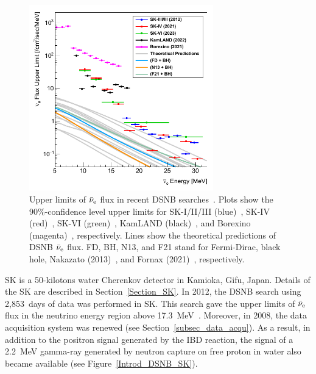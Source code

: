 \begin{figure}[tbp]
	\centering
	\includegraphics[width=8cm]{Figures/Introduction/DSNB_Upper}
	\caption[Upper limits of $\bar{\nu}_{\rm e}$ flux in recent DSNB searches]{
	Upper limits of $\bar{\nu}_{\rm e}$ flux in recent DSNB searches~\cite{2023Ando}.
	Plots show the 90\%-confidence level upper limits for SK-I/II/III (blue)~\cite{2012Abe}, SK-IV (red)~\cite{2021Abe}, SK-VI (green)~\cite{2023Harada}, KamLAND (black)~\cite{2022AbeKamLAND}, and Borexino (magenta)~\cite{2021Agostini}, respectively.
	Lines show the theoretical predictions of DSNB $\bar{\nu}_{\rm e}$ flux.
	FD, BH, N13, and F21 stand for Fermi-Dirac, black hole, Nakazato (2013)~\cite{2013Nakazato}, and Fornax (2021)~\cite{2021Burrows,2021Nakagura}, respectively.
	}\label{Introd_DSNB_Upper}
\end{figure}

\hs
SK is a 50-kilotons water Cherenkov detector in Kamioka, Gifu, Japan.
Details of the SK are described in Section~\ref{Section_SK}.
In 2012, the DSNB search using 2,853~days of data was performed in SK.
This search gave the upper limits of $\bar{\nu}_{\rm e}$ flux in the neutrino energy region above 17.3~MeV~\cite{2012Abe}.
Moreover, in 2008, the data acquisition system was renewed (see Section~\ref{subsec_data_acqu}).
As a result, in addition to the positron signal generated by the IBD reaction, the signal of a 2.2~MeV gamma-ray generated by neutron capture on free proton in water also became available (see Figure~\ref{Introd_DSNB_SK}).

